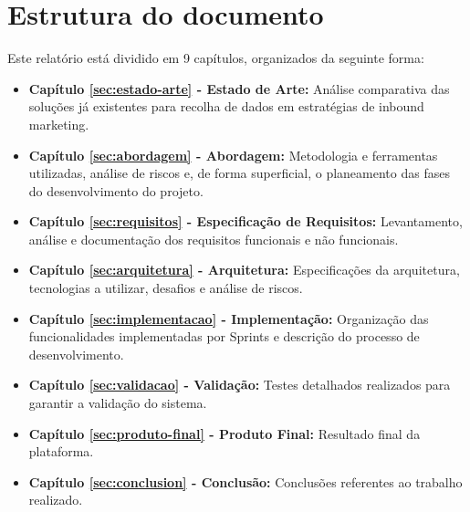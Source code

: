 \section{Estrutura do documento}
\label{subsec:estrutura}

Este relatório está dividido em 9 capítulos, organizados da seguinte forma:
\begin{itemize}
	 \item \textbf{Capítulo \ref{sec:estado-arte} - Estado de Arte: }Análise comparativa das soluções já existentes para recolha de dados em estratégias de inbound marketing.
	
	\item \textbf{Capítulo \ref{sec:abordagem} - Abordagem: }Metodologia e ferramentas utilizadas, análise de riscos e, de forma superficial, o planeamento das fases do desenvolvimento do projeto.
	
	\item \textbf{Capítulo \ref{sec:requisitos} - Especificação de Requisitos: }Levantamento, análise e documentação dos requisitos funcionais e não funcionais.
	
	\item \textbf{Capítulo \ref{sec:arquitetura} - Arquitetura: }Especificações da arquitetura, tecnologias a utilizar, desafios e análise de riscos.
	
	\item \textbf{Capítulo \ref{sec:implementacao} - Implementação: }Organização das funcionalidades implementadas por Sprints e descrição do processo de desenvolvimento.
	
	\item \textbf{Capítulo \ref{sec:validacao} - Validação: }Testes detalhados realizados para garantir a validação do sistema.
	
	\item \textbf{Capítulo \ref{sec:produto-final} - Produto Final: }Resultado final da plataforma.

	\item \textbf{Capítulo \ref{sec:conclusion} - Conclusão: }Conclusões referentes ao trabalho realizado.
	
\end{itemize}



\blankpage

\glsresetall



